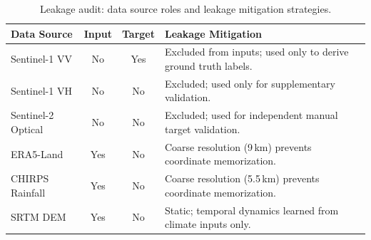\begin{table}[t]
\caption{Leakage audit: data source roles and leakage mitigation strategies.}
\label{tab:leakage_audit}
\centering
\small
\begin{tabular}{p{2.6cm} c c p{6.8cm}}
\hline
\textbf{Data Source} & \textbf{Input} & \textbf{Target} & \textbf{Leakage Mitigation} \\
\hline
Sentinel-1 VV  & No  & Yes & Excluded from inputs; used only to derive ground truth labels. \\
Sentinel-1 VH  & No  & No  & Excluded; used only for supplementary validation. \\
Sentinel-2 Optical & No & No & Excluded; used for independent manual target validation. \\
ERA5-Land      & Yes & No  & Coarse resolution (9\,km) prevents coordinate memorization. \\
CHIRPS Rainfall & Yes & No  & Coarse resolution (5.5\,km) prevents coordinate memorization. \\
SRTM DEM       & Yes & No  & Static; temporal dynamics learned from climate inputs only. \\
\hline
\end{tabular}
\end{table}
